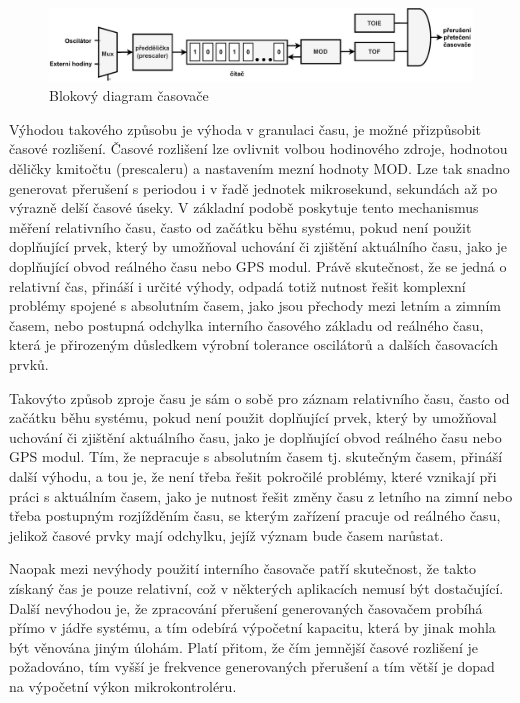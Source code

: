 \begin{figure}[h]
    \centering
    \includegraphics[width=1.00\textwidth]{obrazky-figures/timer-cz.pdf}
    
    \caption{Blokový diagram časovače}
    \label{fig:timer}
\end{figure}

Výhodou takového způsobu je výhoda v granulaci času, je možné přizpůsobit časové rozlišení. Časové rozlišení lze ovlivnit volbou hodinového zdroje, hodnotou děličky kmitočtu (prescaleru) a nastavením mezní hodnoty MOD. Lze tak snadno generovat přerušení s periodou i v řadě jednotek mikrosekund, sekundách až po výrazně delší časové úseky. V základní podobě poskytuje tento mechanismus měření relativního času, často od začátku běhu systému, pokud není použit doplňující prvek, který by umožňoval uchování či zjištění aktuálního času, jako je doplňující obvod reálného času nebo GPS modul. Právě skutečnost, že se jedná o relativní čas, přináší i určité výhody, odpadá totiž nutnost řešit komplexní problémy spojené s absolutním časem, jako jsou přechody mezi letním a zimním časem, nebo postupná odchylka interního časového základu od reálného času, která je přirozeným důsledkem výrobní tolerance oscilátorů a dalších časovacích prvků.

Takovýto způsob zproje času je sám o sobě pro záznam relativního času, často od začátku běhu systému, pokud není použit doplňující prvek, který by umožňoval uchování či zjištění aktuálního času, jako je doplňující obvod reálného času nebo GPS modul. Tím, že nepracuje s absolutním časem tj. skutečným časem, přináší další výhodu, a tou je, že není třeba řešit pokročilé problémy, které vznikají při práci s aktuálním časem, jako je nutnost řešit změny času z letního na zimní nebo třeba postupným rozjížděním času, se kterým zařízení pracuje od reálného času, jelikož časové prvky mají odchylku, jejíž význam bude časem narůstat.

Naopak mezi nevýhody použití interního časovače patří skutečnost, že takto získaný čas je pouze relativní, což v některých aplikacích nemusí být dostačující. Další nevýhodou je, že zpracování přerušení generovaných časovačem probíhá přímo v jádře systému, a tím odebírá výpočetní kapacitu, která by jinak mohla být věnována jiným úlohám. Platí přitom, že čím jemnější časové rozlišení je požadováno, tím vyšší je frekvence generovaných přerušení a tím větší je dopad na výpočetní výkon mikrokontroléru.

